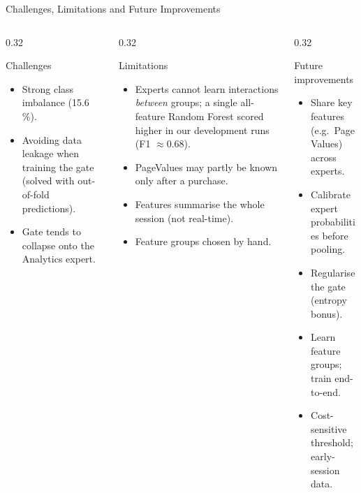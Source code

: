 \documentclass[aspectratio=169,11pt]{beamer}
\begin{document}
\begin{frame}{Challenges, Limitations and Future Improvements}
  \begin{columns}[T,onlytextwidth]
    \begin{column}{0.32\textwidth}
      \begin{block}{Challenges}\scriptsize
        \begin{itemize}
          \item Strong class imbalance (15.6\,\%).
          \item Avoiding data leakage when training the gate (solved with out-of-fold predictions).
          \item Gate tends to collapse onto the Analytics expert.
        \end{itemize}
      \end{block}
    \end{column}
    \begin{column}{0.32\textwidth}
      \begin{block}{Limitations}\scriptsize
        \begin{itemize}
          \item Experts cannot learn interactions \emph{between} groups; a single all-feature Random Forest scored higher in our development runs (F1 $\approx$0.68).
          \item PageValues may partly be known only after a purchase.
          \item Features summarise the whole session (not real-time).
          \item Feature groups chosen by hand.
        \end{itemize}
      \end{block}
    \end{column}
    \begin{column}{0.32\textwidth}
      \begin{block}{Future improvements}\scriptsize
        \begin{itemize}
          \item Share key features (e.g.\ PageValues) across experts.
          \item Calibrate expert probabilities before pooling.
          \item Regularise the gate (entropy bonus).
          \item Learn feature groups; train end-to-end.
          \item Cost-sensitive threshold; early-session data.
        \end{itemize}
      \end{block}
    \end{column}
  \end{columns}
\end{frame}
\end{document}
